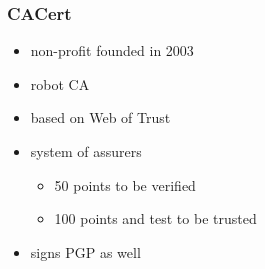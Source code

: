 \begin{frame}[t]
   \frametitle{CACert}
   \begin{itemize}
      \item non-profit founded in 2003
      \item robot CA
      \item based on Web of Trust
      \item system of assurers
      \begin{itemize}
         \item 50 points to be verified
         \item 100 points and test to be trusted
      \end{itemize}
      \item signs PGP as well
   \end{itemize}
\end{frame}

